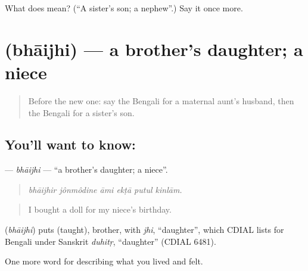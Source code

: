 \begin{tcolorbox}[breakable,colback=teal!4,colframe=teal!35!black,title={Before you move on}]
What does  mean? (\textquotedblleft{}A sister's son; a nephew\textquotedblright{}.) Say it once more.
\end{tcolorbox}
\section[\texorpdfstring{\bn{ভাইঝি} (bhāijhi)}{ভাইঝি (bhāijhi)}]{ (bhāijhi) — a brother's daughter; a niece}

\label{lesson:BN-C482-bhaijhi}



\begin{quote}
Before the new one: say the Bengali for a maternal aunt's husband, then the Bengali for a sister's son.
\end{quote}

\subsection*{You'll want to know: }
\textbf{} — \emph{bhāijhi} — \textquotedblleft{}a brother's daughter; a niece\textquotedblright{}.

\begin{quote}
     
\end{quote}

\begin{quote}
\emph{bhāijhir jônmôdine āmi ekṭā putul kinlām.}
\end{quote}

\begin{quote}
I bought a doll for my niece's birthday.
\end{quote}

\begin{cousinweb}
\textbf{} (\emph{bhāijhi}) puts  (taught), brother, with \emph{jhi}, \textquotedblleft{}daughter\textquotedblright{}, which CDIAL lists for Bengali under Sanskrit \emph{duhitṛ}, \textquotedblleft{}daughter\textquotedblright{} (CDIAL 6481).
\end{cousinweb}

\begin{grammarlens}[title={What you've built}]
One more word for describing what you lived and felt.
\end{grammarlens}

